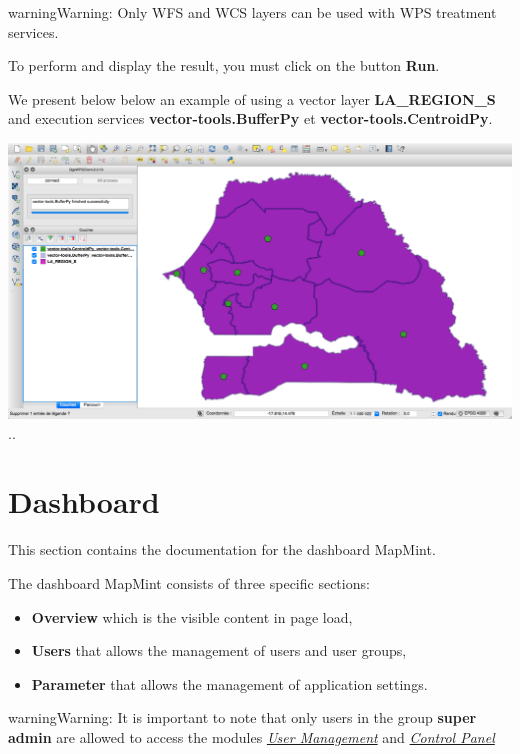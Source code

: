 \documentclass[letterpaper,10pt,english]{sphinxmanual}
\begin{document}
\begin{notice}{warning}{Warning:}
Only WFS and WCS layers can be used with WPS treatment services.
\end{notice}

To perform and display the result, you must click on the button \textbf{Run}.

We present below below an example of using a vector layer \textbf{LA\_REGION\_S} and execution services \textbf{vector-tools.BufferPy} et \textbf{vector-tools.CentroidPy}.

\includegraphics{qgis-wps-result.png}
..


\chapter{Dashboard}
\label{dashboard/index:tableau-de-bord}\label{dashboard/index::doc}\label{dashboard/index:dashboard}
This section contains the documentation for the dashboard MapMint.

The dashboard MapMint consists of three specific sections:
\begin{itemize}
\item {} 
\textbf{Overview} which is the visible content in page load,

\item {} 
\textbf{Users} that allows the management of users and user groups,

\item {} 
\textbf{Parameter} that allows the management of application settings.

\end{itemize}

\begin{notice}{warning}{Warning:}
It is important to note that only users in the group \textbf{super admin}  are allowed to access the modules {\hyperref[dashboard/usersmanagement:dashboard-usersmanagement]{\emph{User Management}}} and {\hyperref[dashboard/configuration:dashboard-configuration]{\emph{Control Panel}}}
\end{notice}
\end{document}
